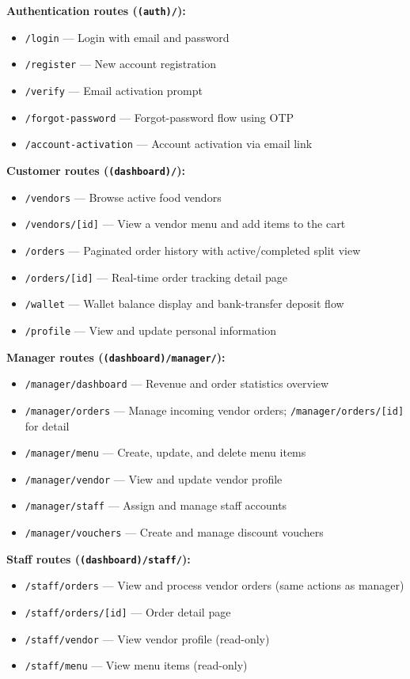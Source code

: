 \noindent
\textbf{Authentication routes (\texttt{(auth)/}):}
\begin{itemize}
    \item \texttt{/login} --- Login with email and password
    \item \texttt{/register} --- New account registration
    \item \texttt{/verify} --- Email activation prompt
    \item \texttt{/forgot-password} --- Forgot-password flow using OTP
    \item \texttt{/account-activation} --- Account activation via email link
\end{itemize}

\noindent
\textbf{Customer routes (\texttt{(dashboard)/}):}
\begin{itemize}
    \item \texttt{/vendors} --- Browse active food vendors
    \item \texttt{/vendors/[id]} --- View a vendor menu and add items to the cart
    \item \texttt{/orders} --- Paginated order history with active/completed split view
    \item \texttt{/orders/[id]} --- Real-time order tracking detail page
    \item \texttt{/wallet} --- Wallet balance display and bank-transfer deposit flow
    \item \texttt{/profile} --- View and update personal information
\end{itemize}

\noindent
\textbf{Manager routes (\texttt{(dashboard)/manager/}):}
\begin{itemize}
    \item \texttt{/manager/dashboard} --- Revenue and order statistics overview
    \item \texttt{/manager/orders} --- Manage incoming vendor orders; \texttt{/manager/orders/[id]} for detail
    \item \texttt{/manager/menu} --- Create, update, and delete menu items
    \item \texttt{/manager/vendor} --- View and update vendor profile
    \item \texttt{/manager/staff} --- Assign and manage staff accounts
    \item \texttt{/manager/vouchers} --- Create and manage discount vouchers
\end{itemize}

\noindent
\textbf{Staff routes (\texttt{(dashboard)/staff/}):}
\begin{itemize}
    \item \texttt{/staff/orders} --- View and process vendor orders (same actions as manager)
    \item \texttt{/staff/orders/[id]} --- Order detail page
    \item \texttt{/staff/vendor} --- View vendor profile (read-only)
    \item \texttt{/staff/menu} --- View menu items (read-only)
\end{itemize}

